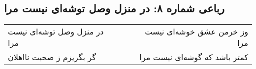 \begin{center}
\section*{رباعی شماره ۸: در منزل وصل توشه‌ای نیست مرا}
\label{sec:sh008}
\begin{longtable}{l p{0.5cm} r}
در منزل وصل توشه‌ای نیست مرا
&&
وز خرمن عشق خوشه‌ای نیست مرا
\\
گر بگریزم ز صحبت نااهلان
&&
کمتر باشد که گوشه‌ای نیست مرا
\\
\end{longtable}
\end{center}
